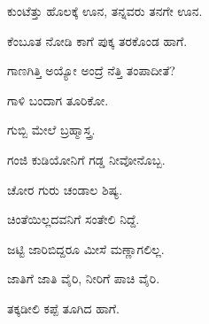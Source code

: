 \noindent\hspace*{0.6em}\kbvbullet\hspace{0.55em}ಕುಂಟೆತ್ತು ಹೊಲಕ್ಕೆ ಊನ, ತನ್ನವರು ತನಗೇ ಊನ.\par

\noindent\hspace*{0.6em}\kbvbullet\hspace{0.55em}ಕೆಂಬೂತ ನೋಡಿ ಕಾಗೆ ಪುಕ್ಕ ತರಕೊಂಡ ಹಾಗೆ.\par

\noindent\hspace*{0.6em}\kbvbullet\hspace{0.55em}ಗಾಣಗಿತ್ತಿ ಅಯ್ಯೋ ಅಂದ್ರೆ ನೆತ್ತಿ ತಂಪಾದೀತೆ?\par

\noindent\hspace*{0.6em}\kbvbullet\hspace{0.55em}ಗಾಳಿ ಬಂದಾಗ ತೂರಿಕೋ.\par

\noindent\hspace*{0.6em}\kbvbullet\hspace{0.55em}ಗುಬ್ಬಿ ಮೇಲೆ ಬ್ರಹ್ಮಾಸ್ತ್ರ.\par

\noindent\hspace*{0.6em}\kbvbullet\hspace{0.55em}ಗಂಜಿ ಕುಡಿಯೋನಿಗೆ ಗಡ್ಡ ನೀವೋನೊಬ್ಬ.\par

\noindent\hspace*{0.6em}\kbvbullet\hspace{0.55em}ಚೋರ ಗುರು ಚಂಡಾಲ ಶಿಷ್ಯ.\par

\noindent\hspace*{0.6em}\kbvbullet\hspace{0.55em}ಚಿಂತೆಯಿಲ್ಲದವನಿಗೆ ಸಂತೇಲಿ ನಿದ್ದೆ.\par

\noindent\hspace*{0.6em}\kbvbullet\hspace{0.55em}ಜಟ್ಟಿ ಜಾರಿಬಿದ್ದರೂ ಮೀಸೆ ಮಣ್ಣಾಗಲಿಲ್ಲ.\par

\noindent\hspace*{0.6em}\kbvbullet\hspace{0.55em}ಜಾತಿಗೆ ಜಾತಿ ವೈರಿ, ನೀರಿಗೆ ಪಾಚಿ ವೈರಿ.\par

\noindent\hspace*{0.6em}\kbvbullet\hspace{0.55em}ತಕ್ಕಡೀಲಿ ಕಪ್ಪೆ ತೂಗಿದ ಹಾಗೆ.\par

